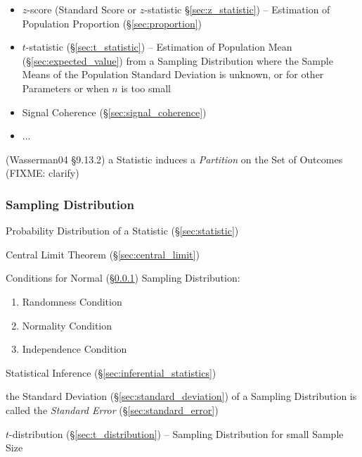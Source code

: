 \asterism

\begin{itemize}
  \item $z$-score (Standard Score or $z$-statistic \S\ref{sec:z_statistic})
    -- Estimation of Population Proportion (\S\ref{sec:proportion})
  \item $t$-statistic (\S\ref{sec:t_statistic}) -- Estimation of Population Mean
    (\S\ref{sec:expected_value}) from a Sampling Distribution where the Sample
    Means of the Population Standard Deviation is unknown, or for other
    Parameters or when $n$ is too small
\end{itemize}

\asterism

\begin{itemize}
  \item Signal Coherence (\S\ref{sec:signal_coherence})
  \item ...
\end{itemize}

\asterism

(Wasserman04 \S9.13.2) a Statistic induces a \emph{Partition} on the Set of
Outcomes (FIXME: clarify)



\subsubsection{Sampling Distribution}\label{sec:sampling_distribution}

Probability Distribution of a Statistic (\S\ref{sec:statistic})

\fist Central Limit Theorem (\S\ref{sec:central_limit})

Conditions for Normal (\S\ref{sec:sampling_distribution}) Sampling Distribution:
\begin{enumerate}
  \item Randomness Condition
  \item Normality Condition
  \item Independence Condition
\end{enumerate}

Statistical Inference (\S\ref{sec:inferential_statistics})

the Standard Deviation (\S\ref{sec:standard_deviation}) of a Sampling
Distribution is called the \emph{Standard Error} (\S\ref{sec:standard_error})

$t$-distribution (\S\ref{sec:t_distribution}) -- Sampling Distribution for small
Sample Size

